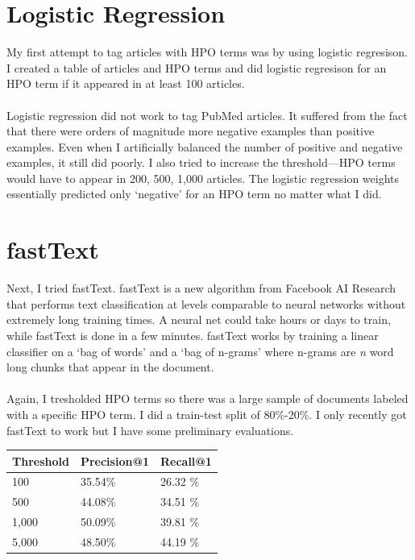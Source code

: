 \documentclass{ws-procs11x85}
\begin{document}
\section{Logistic Regression}
My first attempt to tag articles with HPO terms was by using logistic regresison. I created a table of articles and HPO terms and did logistic regresison for an HPO term if it appeared in at least 100 articles. \\
\\
Logistic regression did not work to tag PubMed articles. It suffered from the fact that there were orders of magnitude more negative examples than positive examples. Even when I artificially balanced the number of positive and negative examples, it still did poorly. I also tried to increase the threshold––HPO terms would have to appear in 200, 500, 1,000 articles. The logistic regression weights essentially predicted only `negative' for an HPO term no matter what I did. 

\section{fastText}
Next, I tried fastText. fastText is a new algorithm from Facebook AI Research that performs text classification at levels comparable to neural networks without extremely long training times. A neural net could take hours or days to train, while fastText is done in a few minutes. fastText works by training a linear classifier on a `bag of words' and a `bag of n-grams' where n-grams are \textit{n} word long chunks that appear in the document. \\
\\
Again, I tresholded HPO terms so there was a large sample of documents labeled with a specific HPO term. I did a train-test split of 80\%-20\%. I only recently got fastText to work but I have some preliminary evaluations. 

\begin{center}
	\begin{tabular}{ | l | l | l | }
	\hline
	Threshold & Precision@1 & Recall@1 \\ \hline 
	100 & 35.54\% & 26.32 \% \\ \hline
	500 & 44.08\% & 34.51 \% \\ \hline 
	1,000 & 50.09\% & 39.81 \% \\ \hline
	5,000 & 48.50\% & 44.19 \% \\ \hline
	\end{tabular}
\end{center}
\end{document}

